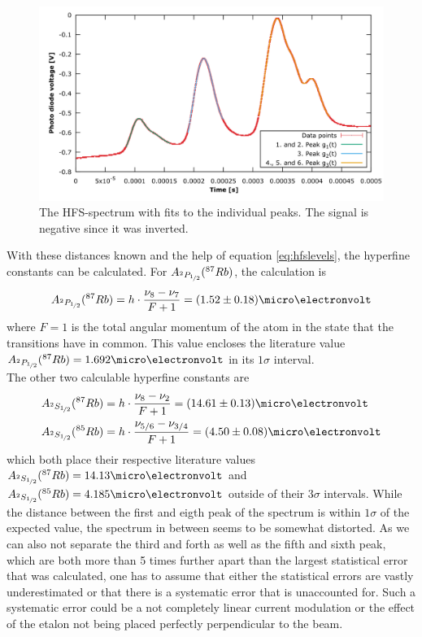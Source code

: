\begin{figure}[htb]
	\centering
	\includegraphics[width=1.0\linewidth]{graphics/HFS_fits}
	\caption[The HFS-spectrum]{The HFS-spectrum with fits to the individual peaks. The signal is negative since it was inverted.}
	\label{fig:HFS_fits}
\end{figure}


With these distances known and the help of equation \ref{eq:hfslevels}, the hyperfine constants can be calculated. For $A_{^2P_{\nicefrac{1}{2}}}(^{87}Rb)$, the calculation is
\begin{equation}
	A_{^2P_{\nicefrac{1}{2}}}(^{87}Rb)=h\cdot\frac{\nu_8-\nu_7}{F+1}=\unit{(1.52\pm0.18)}{\micro\electronvolt}
\end{equation}
where $F=1$ is the total angular momentum of the atom in the state that the transitions have in common. This value encloses the literature value $A_{^2P_{\nicefrac{1}{2}}}(^{87}Rb)=\unit{1.692}{\micro\electronvolt}$ \cite{corney} in its $1\sigma$ interval.\\
The other two calculable hyperfine constants are
\begin{align}
	A_{^2S_{\nicefrac{1}{2}}}(^{87}Rb)&=h\cdot\frac{\nu_8-\nu_2}{F+1}=\unit{(14.61\pm0.13)}{\micro\electronvolt}\\
	A_{^2S_{\nicefrac{1}{2}}}(^{85}Rb)&=h\cdot\frac{\nu_{5/6}-\nu_{3/4}}{F+1}=\unit{(4.50\pm0.08)}{\micro\electronvolt}
\end{align}
which both place their respective literature values $A_{^2S_{\nicefrac{1}{2}}}(^{87}Rb)=\unit{14.13}{\micro\electronvolt}$ and $A_{^2S_{\nicefrac{1}{2}}}(^{85}Rb)=\unit{4.185}{\micro\electronvolt}$ outside of their $3\sigma$ intervals. While the distance between the first and eigth peak of the spectrum is within $1\sigma$ of the expected value, the spectrum in between seems to be somewhat distorted. As we can also not separate the third and forth as well as the fifth and sixth peak, which are both more than 5 times further apart than the largest statistical error that was calculated, one has to assume that either the statistical errors are vastly underestimated or that there is a systematic error that is unaccounted for. Such a systematic error could be a not completely linear current modulation or the effect of the etalon not being placed perfectly perpendicular to the beam.


